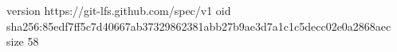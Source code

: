 version https://git-lfs.github.com/spec/v1
oid sha256:85edf7ff5c7d40667ab37329862381abb27b9ae3d7a1c1c5decc02e0a2868aec
size 58
